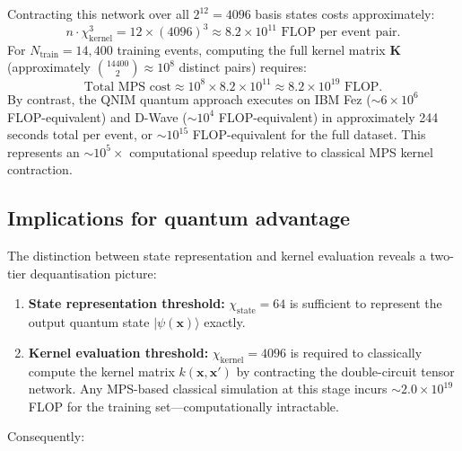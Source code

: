 \documentclass[11pt,a4paper, english]{book}
\theoremstyle{plain}
\theoremstyle{definition}
\numberwithin{equation}{chapter}
\numberwithin{figure}{chapter}
\numberwithin{table}{chapter}
\begin{document}
Contracting this network over all $2^{12} = 4096$ basis states costs approximately:
\begin{equation}
  n \cdot \chi_\mathrm{kernel}^3 = 12 \times (4096)^3 \approx 8.2 \times 10^{11} \text{ FLOP per event pair}.
\end{equation}
For $N_\mathrm{train} = 14{,}400$ training events, computing the full kernel matrix $\mathbf{K}$ 
(approximately $\binom{14400}{2} \approx 10^8$ distinct pairs) requires:
\begin{equation}
  \text{Total MPS cost} \approx 10^8 \times 8.2 \times 10^{11} \approx 8.2 \times 10^{19} \text{ FLOP}.
\end{equation}
By contrast, the QNIM quantum approach executes on IBM Fez ($\sim 6 \times 10^6$ FLOP-equivalent)
and D-Wave ($\sim 10^4$ FLOP-equivalent) in approximately 244 seconds total per event,
or $\sim 10^{15}$ FLOP-equivalent for the full dataset. This represents an $\sim 10^5 \times$
computational speedup relative to classical MPS kernel contraction.

\subsection{Implications for quantum advantage}

The distinction between state representation and kernel evaluation reveals a 
two-tier dequantisation picture:

\begin{enumerate}
  \item \textbf{State representation threshold:} $\chi_\mathrm{state} = 64$ is sufficient 
        to represent the output quantum state $|\psi(\mathbf{x})\rangle$ exactly.
        
  \item \textbf{Kernel evaluation threshold:} $\chi_\mathrm{kernel} = 4096$ is required
        to classically compute the kernel matrix $k(\mathbf{x}, \mathbf{x}')$ by 
        contracting the double-circuit tensor network. Any MPS-based classical 
        simulation at this stage incurs $\sim 2.0 \times 10^{19}$ FLOP for the training 
        set—computationally intractable.
\end{enumerate}

Consequently:
\end{document}
